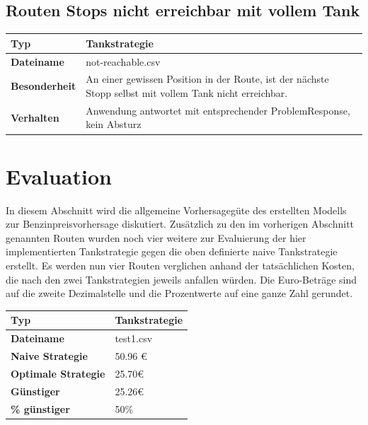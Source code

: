 \documentclass[
ngerman          %
,a4paper          %
,11pt
,pdftex
]{report}
\begin{document}
\subsection{Routen Stops nicht erreichbar mit vollem Tank}

\begin{table}[H]
	\centering
	\begin{tabular}{l p{12cm}}
		\textbf{Typ} & \textbf{Tankstrategie} \\ 
		\hline
		\hline
		\textbf{Dateiname} & not-reachable.csv \\
        \textbf{Besonderheit} & An einer gewissen Position in der Route, ist der nächste Stopp selbst mit vollem Tank nicht erreichbar. \\
        \textbf{Verhalten} & Anwendung antwortet mit entsprechender ProblemResponse, kein Absturz \\
		\hline 
	\end{tabular}
\end{table} 


\section{Evaluation}
In diesem Abschnitt wird die allgemeine Vorhersagegüte des erstellten Modells zur Benzinpreisvorhersage diskutiert. Zusätzlich zu den im vorherigen Abschnitt genannten Routen wurden noch vier weitere zur Evaluierung der hier implementierten Tankstrategie gegen die oben definierte naive Tankstrategie erstellt. Es werden nun vier Routen verglichen anhand der tatsächlichen Kosten, die nach den zwei Tankstrategien jeweils anfallen würden. Die Euro-Beträge sind auf die zweite Dezimalstelle und die Prozentwerte auf eine ganze Zahl gerundet.

\begin{table}[H]
	\centering
	\begin{tabular}{l l}
		\textbf{Typ} & \textbf{Tankstrategie} \\ 
		\hline
		\hline
		\textbf{Dateiname} & test1.csv \\
        \textbf{Naive Strategie} & 50.96 \euro{} \\
        \textbf{Optimale Strategie} & 25.70\euro{} \\
  		\textbf{Günstiger} & 25.26\euro{} \\
        \textbf{\% günstiger} & 50\% \\
		\hline 
	\end{tabular}
\end{table} 
\end{document}
